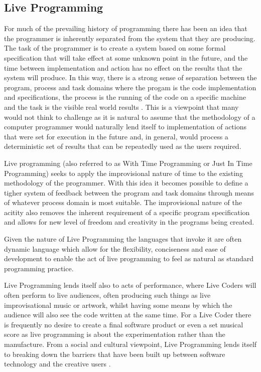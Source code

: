 \documentclass[11pt]{scrartcl}
\begin{document}
\subsection{Live Programming}
For much of the prevailing history of programming there has been an idea that 
the programmer is inherently separated from the system that they are 
producing. The task of the programmer is to create a system based on some 
formal specification that will take effect at some unknown point in the 
future, and the time between implementation and action has no effect on the 
results that the system will produce. In this way, there is a strong sense of 
separation between the program, process and task domains where the progam is 
the code implementation and specifications, the process is the running of the 
code on a specific machine and the task is the visible real world results
\cite{SG10}. This is a viewpoint that many would not think to challenge as it 
is natural to assume that the methodology of a computer programmer would 
naturally lend itself to implementation of actions that were set for execution 
in the future and, in general, would process a deterministic set of results 
that can be repeatedly used as the users required.

Live programming (also referred to as With Time Programming or Just In Time 
Programming) seeks to apply the improvisional nature of time to the existing 
methodology of the programmer. With this idea it becomes possible to define a 
tigher system of feedback between the program and task domains through means 
of whatever process domain is most suitable. The improvisional nature of the 
acitity also removes the inherent requirement of a specific program 
specification and allows for new level of freedom and creativity in the 
programs being created. 

Given the nature of Live Programming the languages that invoke it are often 
dynamic language which allow for the flexibility, conciseness and ease of 
development \cite{McD07} to enable the act of live programming to feel as 
natural as standard programming practice.

Live Programming lends itself also to acts of performance, where Live Coders 
will often perform to live audiences, often producing such things as live 
improvisational music or artwork, whilst having some means by which the 
audience will also see the code written at the same time. For a Live Coder 
there is frequently no desire to create a final software product or even a set 
musical score as live programming is about the experimentation rather than the 
manufacture. From a social and cultural viewpoint, Live Programming lends 
itself to breaking down the barriers that have been built up between software 
technology and the creative users \cite{McL13}.
\end{document}
